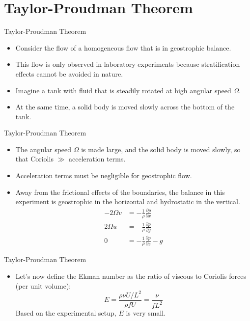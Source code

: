 \section{Taylor-Proudman Theorem} %
\begin{frame}{Taylor-Proudman Theorem}

\begin{itemize}
	\item Consider the flow of a homogeneous flow that is in geostrophic balance.
	\item This flow is only observed in laboratory experiments because stratification effects cannot be avoided in nature.
	\item Imagine a tank with fluid that is steadily rotated at high angular speed $\Omega$.
	\item At the same time, a solid body is moved slowly across the bottom of the tank.
\end{itemize}
\end{frame}
\begin{frame}{Taylor-Proudman Theorem}

\begin{itemize}
	\item The angular speed $\Omega$ is made large, and the solid body is moved slowly, so that Coriolis $\gg$ acceleration terms.
	\item Acceleration terms must be negligible for geostrophic flow.
	\item Away from the frictional effects of the boundaries, the balance in this experiment is geostrophic in the horizontal and hydrostatic in the vertical.
	\begin{align}
		-2\Omega v &= -\frac{1}{\rho}\frac{\partial p}{\partial x} \label{eq1}\\
		2\Omega u &= -\frac{1}{\rho}\frac{\partial p}{\partial y}\label{eq2}\\
		0 &= -\frac{1}{\rho}\frac{\partial p}{\partial z} -g\label{eq3}
	\end{align}
\end{itemize}
\end{frame}

\begin{frame}{Taylor-Proudman Theorem}

\begin{itemize}
	\item Let's now define the Ekman number as the ratio of viscous to Coriolis forces (per unit volume):
	$$E = \frac{\rho\nu U/L^2}{\rho fU} = \frac{\nu}{fL^2}$$
	Based on the experimental setup, $E$ is very small.
\end{itemize}
\end{frame}

